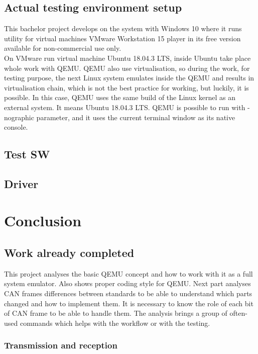 \documentclass{ctuthesis}
\begin{document}
 \section{Actual testing environment setup}
  This bachelor project develops on the system with Windows 10 where it runs utility for virtual machines VMware  Workstation 15 player in its free version available for non-commercial use only. \cite{vmware} \\
  On VMware run virtual machine Ubuntu 18.04.3 LTS, \cite{ubuntu} inside Ubuntu take place whole work with QEMU. QEMU also use virtualisation, so during the work, for testing purpose, the next Linux system emulates inside the QEMU and results in virtualisation chain, which is not the best practice for working, but luckily, it is possible. In this case, QEMU uses the same build of the Linux kernel as an external system. It means Ubuntu 18.04.3 LTS. QEMU is possible to run with -nographic parameter, and it uses the current terminal window as its native console. \\

 \section{Test SW}
 
 \section{Driver}
 
\chapter{Conclusion}

 \section{Work already completed}
  This project analyses the basic QEMU concept and how to work with it as a full system emulator. Also shows proper coding style for QEMU.  Next part analyses CAN frames differences between standards to be able to understand which parts changed and how to implement them. It is necessary to know the role of each bit of CAN frame to be able to handle them. The analysis brings a group of often-used commands which helps with the workflow or with the testing.
 
 \subsection{Transmission and reception}
\end{document}
